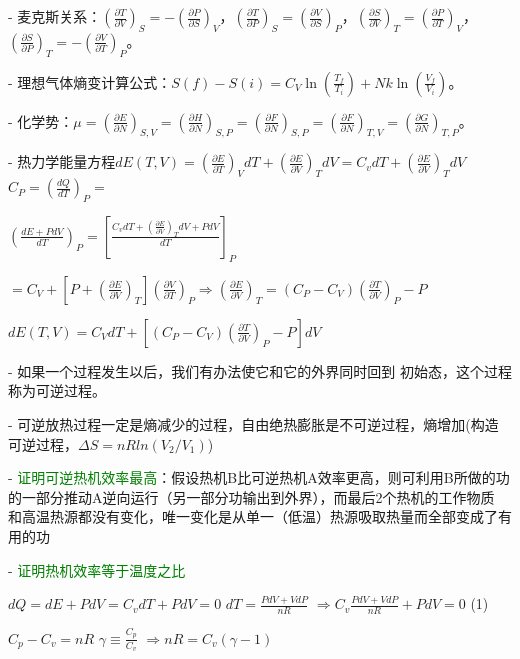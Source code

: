 \documentclass[a4paper,8pt]{extarticle} %
\newcommand{\greentext}[1]{\textcolor{green}{#1}}
\begin{document}
\begin{multicols}{3}
- 麦克斯关系：$\left(\frac{\partial T}{\partial V}\right)_S = -\left(\frac{\partial P}{\partial S}\right)_V$，$\left(\frac{\partial T}{\partial P}\right)_S = \left(\frac{\partial V}{\partial S}\right)_P$，$\left(\frac{\partial S}{\partial V}\right)_T = \left(\frac{\partial P}{\partial T}\right)_V$，$\left(\frac{\partial S}{\partial P}\right)_T = -\left(\frac{\partial V}{\partial T}\right)_P$。

- 理想气体熵变计算公式：$S(f) - S(i) = C_V \ln\left(\frac{T_f}{T_i}\right) + Nk\ln\left(\frac{V_f}{V_i}\right)$。

- 化学势：$\mu = \left(\frac{\partial E}{\partial N}\right)_{S,V} = \left(\frac{\partial H}{\partial N}\right)_{S,P} = \left(\frac{\partial F}{\partial N}\right)_{S,P} = \left(\frac{\partial F}{\partial N}\right)_{T,V} = \left(\frac{\partial G}{\partial N}\right)_{T,P}$。

- 热力学能量方程$dE(T,V) = \left(\frac{\partial E}{\partial T}\right)_V dT + \left(\frac{\partial E}{\partial V}\right)_T dV = C_v dT + \left(\frac{\partial E}{\partial V}\right)_T dV$
$C_P = \left(\frac{dQ}{dT}\right)_P =$ 

$ \left(\frac{dE + PdV}{dT}\right)_P = \left[\frac{C_v dT + \left(\frac{\partial E}{\partial V}\right)_T dV + PdV}{dT}\right]_P$

$= C_V + \left[P + \left(\frac{\partial E}{\partial V}\right)_T\right]\left(\frac{\partial V}{\partial T}\right)_P \Rightarrow \left(\frac{\partial E}{\partial V}\right)_T = (C_P - C_V)\left(\frac{\partial T}{\partial V}\right)_P - P$

$dE(T,V) = C_V dT + \left[(C_P - C_V)\left(\frac{\partial T}{\partial V}\right)_P - P\right]dV$

- 如果一个过程发生以后，我们有办法使它和它的外界同时回到
初始态，这个过程称为可逆过程。

- 可逆放热过程一定是熵减少的过程，自由绝热膨胀是不可逆过程，熵增加(构造可逆过程，$\Delta S=nRln(V_2/V_1)$)

- \greentext{证明可逆热机效率最高}：假设热机B比可逆热机A效率更高，则可利用B所做的功的一部分推动A逆向运行（另一部分功输出到外界），而最后2个热机的工作物质
和高温热源都没有变化，唯一变化是从单一（低温）热源吸取热量而全部变成了有用的功

- \greentext{证明热机效率等于温度之比}

$dQ = dE + PdV = C_v dT + PdV = 0$
$ dT = \frac{PdV + VdP}{nR}$
$\Rightarrow C_v \frac{PdV + VdP}{nR} + PdV = 0$ (1)

$C_p - C_v = nR$
$\gamma \equiv \frac{C_p}{C_v}$
$\Rightarrow nR = C_v(\gamma-1)$


\end{multicols}
\end{document}
